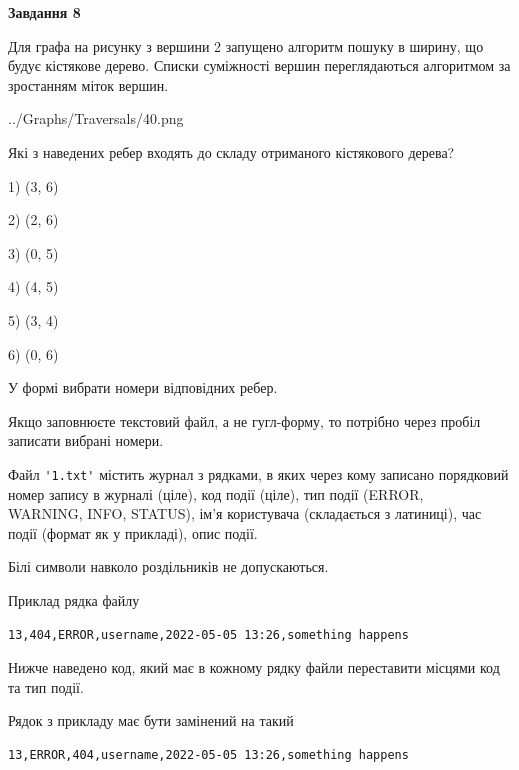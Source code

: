 \documentclass[12pt, ukrainian]{article}
\def\code#1{\Verb!#1!}
\begin{document}
{\begin {large}
{\begin {center}\textbf{Завдання 8}\end {center}}\par
Для графа на рисунку з вершини 2 запущено алгоритм пошуку в ширину, що будує кістякове дерево. Списки суміжності вершин переглядаються алгоритмом за зростанням міток вершин.\par
\begin{center}
	{../Graphs/Traversals/40.png}
\end{center}
\par Які з наведених ребер входять до складу отриманого кістякового дерева?\par
1) (3, 6)\par
2) (2, 6)\par
3) (0, 5)\par
4) (4, 5)\par
5) (3, 4)\par
6) (0, 6)\par
{\vskip 15pt} У формі вибрати номери відповідних ребер.


Якщо заповнюєте текстовий файл, а не гугл-форму, то потрібно через пробіл записа\-ти вибрані номери.\par
\newpage


Файл \code{'1.txt'} містить журнал з рядками, в яких через кому записано поряд\-ко\-вий номер запису в журналі (ціле), код події (ціле), тип події (ERROR,\\ WARNING, INFO, STATUS), ім'я користувача (складається з латиниці), час події (фор\-мат як у прикладі), опис події.

Білі символи навколо роздільників не допускаються.

Приклад рядка файлу



\begin{verbatim}
13,404,ERROR,username,2022-05-05 13:26,something happens
\end{verbatim}


Нижче наведено код, який має в кожному рядку файли переставити місцями код та тип події.

Рядок з прикладу має бути замінений на такий



\begin{verbatim}
13,ERROR,404,username,2022-05-05 13:26,something happens
\end{verbatim}





\end{large}}
\end{document}

